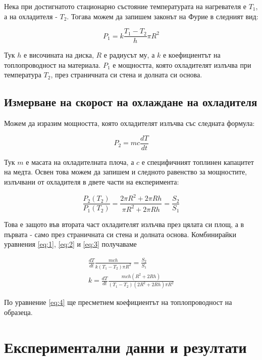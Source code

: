\documentclass[reprint,amsmath,amssymb,aps]{revtex4-2}
\begin{document}
Нека при достигнатото стационарно състояние температурата на нагревателя е $T_1$, а на охладителя - $T_2$. Тогава можем да запишем законът на Фурие в следният вид:

\begin{equation*} \label{eq:1}
    P_1 = k\frac{T_1 - T_2}{h} \pi R^2 \tag{1}
\end{equation*}

Тук $h$ е височината на диска, $R$ е радиусът му, а $k$ е коефициентът на топлопроводност на материала. $P_1$ е мощността, която охладителят излъчва при температура $T_2$, през страничната си стена и долната си основа.

\subsection{Измерване на скорост на охлаждане на охладителя}

Можем да изразим мощността, която охладителят излъчва със следната формула: 

\begin{equation*} \label{eq:2}
    P_2 = m c \frac{dT}{dt} \tag{2}
\end{equation*}

Тук $m$ е масата на охладителната плоча, а $c$ е специфичният топлинен капацитет на медта. Освен това можем да запишем и следното равенство за мощностите, излъчвани от охладителя в двете части на експеримента: 

\begin{equation*} \label{eq:3}
    \frac{P_2(T_2)}{P_1(T_2)} = \frac{2\pi R^2 + 2\pi Rh}{\pi R^2 + 2\pi Rh} = \frac{S_2}{S_1} \tag{3}
\end{equation*}

Това е защото във втората част охладителят излъчва през цялата си площ, а в първата - само през страничната си стена и долната основа. Комбинирайки уравнения \eqref{eq:1}, \eqref{eq:2} и \eqref{eq:3} получаваме 

\begin{align*}
    \frac{dT}{dt} \frac{mc h}{k (T_1 - T_2) \pi R^2} = \frac{S_2}{S_1} \\
    k = \frac{dT}{dt} \frac{mc h ( R^2 + 2 Rh)}{(T_1 - T_2) (2 R^2 + 2 Rh) \pi R^2} \label{eq:4} \tag{4}
\end{align*}

По уравнение \eqref{eq:4} ще пресметнем коефициентът на топлопроводност на образеца. 

\section{Експериментални данни и резултати}
\end{document}
